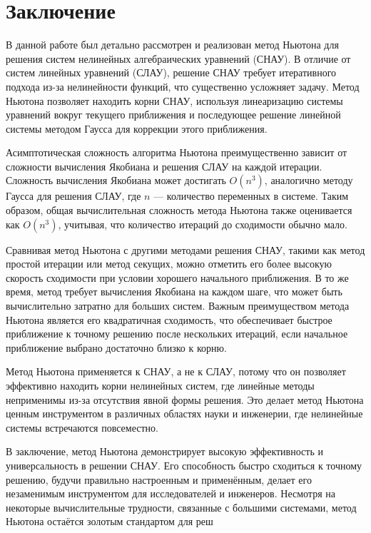 \newpage
\section{Заключение}

В данной работе был детально рассмотрен и реализован метод Ньютона для решения систем нелинейных алгебраических уравнений (СНАУ). В отличие от систем линейных уравнений (СЛАУ), решение СНАУ требует итеративного подхода из-за нелинейности функций, что существенно усложняет задачу. Метод Ньютона позволяет находить корни СНАУ, используя линеаризацию системы уравнений вокруг текущего приближения и последующее решение линейной системы методом Гаусса для коррекции этого приближения.

Асимптотическая сложность алгоритма Ньютона преимущественно зависит от сложности вычисления Якобиана и решения СЛАУ на каждой итерации. Сложность вычисления Якобиана может достигать \(O(n^3)\), аналогично методу Гаусса для решения СЛАУ, где \(n\) — количество переменных в системе. Таким образом, общая вычислительная сложность метода Ньютона также оценивается как \(O(n^3)\), учитывая, что количество итераций до сходимости обычно мало.

Сравнивая метод Ньютона с другими методами решения СНАУ, такими как метод простой итерации или метод секущих, можно отметить его более высокую скорость сходимости при условии хорошего начального приближения. В то же время, метод требует вычисления Якобиана на каждом шаге, что может быть вычислительно затратно для больших систем. Важным преимуществом метода Ньютона является его квадратичная сходимость, что обеспечивает быстрое приближение к точному решению после нескольких итераций, если начальное приближение выбрано достаточно близко к корню.

Метод Ньютона применяется к СНАУ, а не к СЛАУ, потому что он позволяет эффективно находить корни нелинейных систем, где линейные методы неприменимы из-за отсутствия явной формы решения. Это делает метод Ньютона ценным инструментом в различных областях науки и инженерии, где нелинейные системы встречаются повсеместно.

В заключение, метод Ньютона демонстрирует высокую эффективность и универсальность в решении СНАУ. Его способность быстро сходиться к точному решению, будучи правильно настроенным и применённым, делает его незаменимым инструментом для исследователей и инженеров. Несмотря на некоторые вычислительные трудности, связанные с большими системами, метод Ньютона остаётся золотым стандартом для реш
